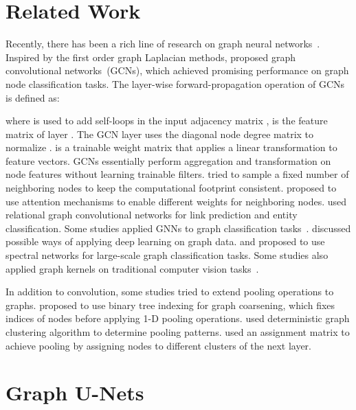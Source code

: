 \documentclass{article}
\begin{document}
\section{Related Work}

Recently, there has been a rich line of research on graph neural
networks~\citep{gilmer2017neural}. Inspired by the first order graph
Laplacian methods, \cite{kipf2016semi} proposed graph convolutional
networks~(GCNs), which achieved promising performance on graph node
classification tasks. The layer-wise forward-propagation operation
of GCNs is defined as:

where  is used to add self-loops in the input
adjacency matrix ,  is the feature matrix of layer
. The GCN layer uses the diagonal node degree matrix 
to normalize .  is a trainable weight matrix that
applies a linear transformation to feature vectors. GCNs essentially
perform aggregation and transformation on node features without
learning trainable filters. \cite{hamilton2017inductive} tried to
sample a fixed number of neighboring nodes to keep the computational
footprint consistent. \cite{velivckovic2017graph} proposed to use
attention mechanisms to enable different weights for neighboring
nodes. \cite{schlichtkrull2018modeling} used relational graph
convolutional networks for link prediction and entity
classification. Some studies applied GNNs to graph classification
tasks~\citep{duvenaud2015convolutional,dai2016discriminative,zhang2018end}.
\cite{bronstein2017geometric} discussed possible
ways of applying deep learning on graph data. \cite{henaff2015deep}
and \cite{bruna2014spectral} proposed to use spectral networks for
large-scale graph classification tasks. Some studies also applied
graph kernels on traditional computer vision
tasks~\citep{gama2019convolutional,fey2018splinecnn,monti2017geometric}.

In addition to convolution, some studies tried to extend pooling operations to
graphs. \cite{defferrard2016convolutional} proposed to use binary tree
indexing for graph coarsening, which fixes indices of nodes before applying
1-D pooling operations. \cite{simonovsky2017dynamic} used deterministic graph
clustering algorithm to determine pooling patterns.
\cite{ying2018hierarchical} used an assignment matrix to achieve pooling by
assigning nodes to different clusters of the next layer.



\section{Graph U-Nets}
\end{document}
